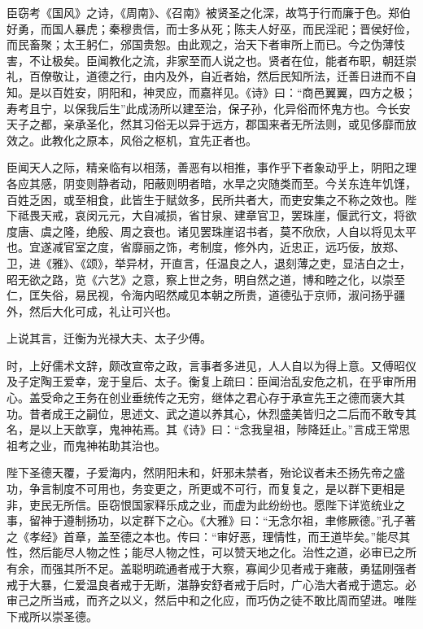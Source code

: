 \documentclass[12pt,UTF8]{ctexbook}
\begin{document}
臣窃考《国风》之诗，《周南》、《召南》被贤圣之化深，故笃于行而廉于色。郑伯好勇，而国人暴虎；秦穆贵信，而士多从死；陈夫人好巫，而民淫祀；晋侯好俭，而民畜聚；太王躬仁，邠国贵恕。由此观之，治天下者审所上而已。今之伪薄忮害，不让极矣。臣闻教化之流，非家至而人说之也。贤者在位，能者布职，朝廷崇礼，百僚敬让，道德之行，由内及外，自近者始，然后民知所法，迁善日进而不自知。是以百姓安，阴阳和，神灵应，而嘉祥见。《诗》曰：“商邑翼翼，四方之极；寿考且宁，以保我后生”此成汤所以建至治，保子孙，化异俗而怀鬼方也。今长安天子之都，亲承圣化，然其习俗无以异于远方，郡国来者无所法则，或见侈靡而放效之。此教化之原本，风俗之枢机，宜先正者也。



臣闻天人之际，精亲临有以相荡，善恶有以相推，事作乎下者象动乎上，阴阳之理各应其感，阴变则静者动，阳蔽则明者暗，水旱之灾随类而至。今关东连年饥馑，百姓乏困，或至相食，此皆生于赋敛多，民所共者大，而吏安集之不称之效也。陛下祗畏天戒，哀闵元元，大自减损，省甘泉、建章官卫，罢珠崖，偃武行文，将欲度唐、虞之隆，绝殷、周之衰也。诸见罢珠崖诏书者，莫不欣欣，人自以将见太平也。宜遂减官室之度，省靡丽之饰，考制度，修外内，近忠正，远巧佞，放郑、卫，进《雅》、《颂》，举异材，开直言，任温良之人，退刻薄之吏，显洁白之士，昭无欲之路，览《六艺》之意，察上世之务，明自然之道，博和睦之化，以崇至仁，匡失俗，易民视，令海内昭然咸见本朝之所贵，道德弘于京师，淑问扬乎疆外，然后大化可成，礼让可兴也。



上说其言，迁衡为光禄大夫、太子少傅。



时，上好儒术文辞，颇改宣帝之政，言事者多进见，人人自以为得上意。又傅昭仪及子定陶王爱幸，宠于皇后、太子。衡复上疏曰：臣闻治乱安危之机，在乎审所用心。盖受命之王务在创业垂统传之无穷，继体之君心存于承宣先王之德而褒大其功。昔者成王之嗣位，思述文、武之道以养其心，休烈盛美皆归之二后而不敢专其名，是以上天歆享，鬼神祐焉。其《诗》曰：“念我皇祖，陟降廷止。”言成王常思祖考之业，而鬼神祐助其治也。



陛下圣德天覆，子爱海内，然阴阳未和，奸邪未禁者，殆论议者未丕扬先帝之盛功，争言制度不可用也，务变更之，所更或不可行，而复复之，是以群下更相是非，吏民无所信。臣窃恨国家释乐成之业，而虚为此纷纷也。愿陛下详览统业之事，留神于遵制扬功，以定群下之心。《大雅》曰：“无念尔祖，聿修厥德。”孔子著之《孝经》首章，盖至德之本也。传曰：“审好恶，理情性，而王道毕矣。”能尽其性，然后能尽人物之性；能尽人物之性，可以赞天地之化。治性之道，必审已之所有余，而强其所不足。盖聪明疏通者戒于大察，寡闻少见者戒于雍蔽，勇猛刚强者戒于大暴，仁爱温良者戒于无断，湛静安舒者戒于后时，广心浩大者戒于遗忘。必审己之所当戒，而齐之以义，然后中和之化应，而巧伪之徒不敢比周而望进。唯陛下戒所以崇圣德。
\end{document}
